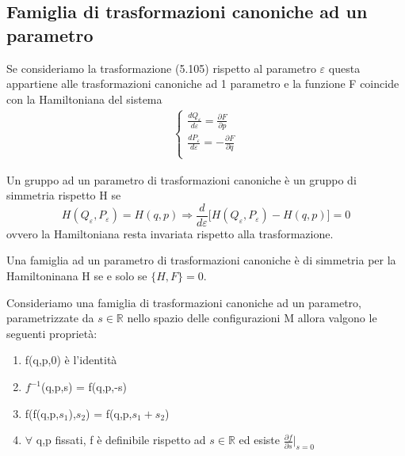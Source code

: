 \subsection{Famiglia di trasformazioni canoniche ad un parametro}
Se consideriamo la trasformazione (5.105) rispetto al parametro $\varepsilon$ questa appartiene alle trasformazioni canoniche ad 1 parametro e la funzione F coincide con la Hamiltoniana del sistema
\begin{align}
	\begin{cases}
		\frac{dQ_{\varepsilon}}{d \varepsilon} = \frac{\partial F}{ \partial p}\\
		\frac{dP_{\varepsilon}}{d \varepsilon} = - \frac{\partial F}{ \partial q}\\
	\end{cases}
\end{align}
\begin{definition}
	Un gruppo ad un parametro di trasformazioni canoniche \`{e} un gruppo di simmetria rispetto H se 
	\begin{equation}
		H(Q_{\varepsilon},P_{\varepsilon}) = H(q,p) \Rightarrow \frac{d}{d \varepsilon}\Big [H(Q_{\varepsilon},P_{\varepsilon}) - H(q,p) \Big ] = 0
	\end{equation}
	ovvero la Hamiltoniana resta invariata rispetto alla trasformazione.
\end{definition}

\begin{definition}
	Una famiglia ad un parametro di trasformazioni canoniche \`{e} di simmetria per la Hamiltoninana H se e solo se $\{H,F\} = 0$.
\end{definition}

\begin{definition}
	Consideriamo una famiglia di trasformazioni canoniche ad un parametro, parametrizzate da $s \in \mathbb{R}$ nello spazio delle configurazioni M allora valgono le seguenti propriet\`{a}:
	\begin{enumerate}
		\item f(q,p,0) \`{e} l'identit\`{a}
		\item $f^{-1}$(q,p,s) = f(q,p,-s) 
		\item f(f(q,p,$s_1$),$s_2$) = f(q,p,$s_1 + s_2$)
		\item $\forall$ q,p fissati, f \`{e} definibile rispetto ad $s \in \mathbb{R}$ ed esiste $\frac{\partial f}{\partial s}\vert_{s=0}$
	\end{enumerate}
\end{definition}

